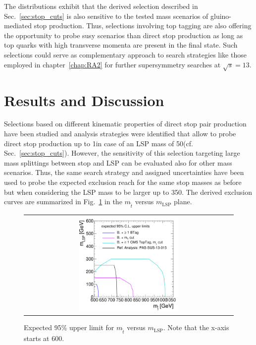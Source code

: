 The distributions exhibit that the derived selection described in Sec.~\ref{sec:stop_cuts} is also sensitive to the tested mass scenarios of gluino-mediated stop production. Thus, selections involving top tagging are also offering the opportunity to probe susy scenarios than direct stop production as long as top quarks with high transverse momenta are present in the final state. Such selections could serve as complementary approach to search strategies like those employed in chapter~\ref{chap:RA2} for further supersymmetry searches at $\sqrt{s} = 13$\tev. 

\section{Results and Discussion}
\label{sec:stop_results}
Selections based on different kinematic properties of direct stop pair production have been studied and analysis strategies were identified that allow to probe direct stop production up to 1\tev in case of an LSP mass of 50\gev (cf. Sec.~\ref{sec:stop_cuts}). However, the sensitivity of this selection targeting large mass splittings between stop and LSP can be evaluated also for other mass scenarios. Thus, the same search strategy and assigned uncertainties have been used to probe the expected exclusion reach for the same stop masses as before but when considering the LSP mass to be larger up to 350\gev. The derived exclusion curves are summarized in Fig.~\ref{fig:stop_2Dlimit} in the $m_{\tilde{t}}$ versus $m_\mathrm{LSP}$ plane. \\
\begin{figure}[!h]
  \centering
  \begin{tabular}{c}
                \includegraphics[width=0.49\textwidth]{figures/2Dlimitplot.pdf} 
  \end{tabular}
  \caption{Expected 95\% upper limit for $m_{\tilde{t}}$ versus $m_\mathrm{LSP}$. Note that the x-axis starts at 600\gev. }
  \label{fig:stop_2Dlimit}
\end{figure}

